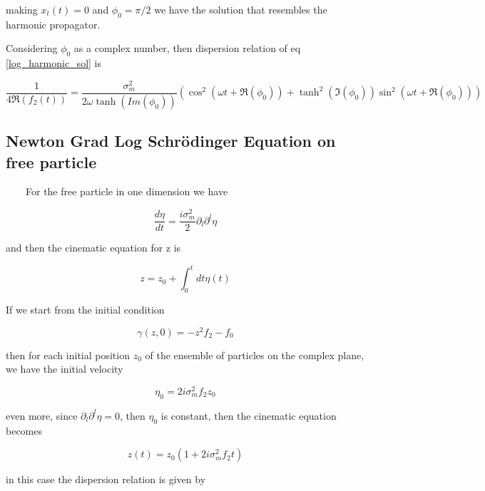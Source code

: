 \documentclass[a4paper,12pt]{article}
\begin{document}
making $x_t(t) = 0$ and $\phi_0 = \pi/2$ we have the solution that resembles the harmonic propagator. 

Considering $\phi_0$ as a complex number, then dispersion relation of eq \ref{log_harmonic_sol} is

\begin{equation}\label{dispersion_harmonic}
\frac{1}{4\Re(f_2(t))} = \frac{ \sigma_m^2 }{2 \omega \tanh(Im(\phi_0))}  (\cos^2(\omega t + \Re(\phi_0)) + \tanh^2(\Im(\phi_0)) \sin^2(\omega t + \Re(\phi_0)))
\end{equation}




\subsection{Newton Grad Log Schr\"odinger Equation on free particle}

~~~~For the free particle in one dimension we have

\begin{equation}
\frac{d \eta}{dt} =  \frac{i\sigma_m^2}{2 } \partial_l \partial^l \eta
\end{equation}

and then the cinematic equation for z is

\begin{equation}
z  =  z_0 + \int_0^t dt \eta(t)
\end{equation}

If we start from the initial condition

\begin{equation}
\gamma(z,0) = -z^2 f_2 - f_0
\end{equation} 

then for each initial position $z_0$ of the ensemble of particles  on the complex plane, we have the initial velocity

\begin{equation}
\eta_0 = 2 i \sigma_m^2 f_2 z_0
\end{equation}

even more, since $\partial_l \partial^l \eta = 0$, then $\eta_0$ is constant, then the cinematic equation becomes

\begin{equation}
z(t) = z_0(1+2i\sigma_m^2f_2t)
\end{equation}

in this case the dispersion relation is given by 
\end{document}
